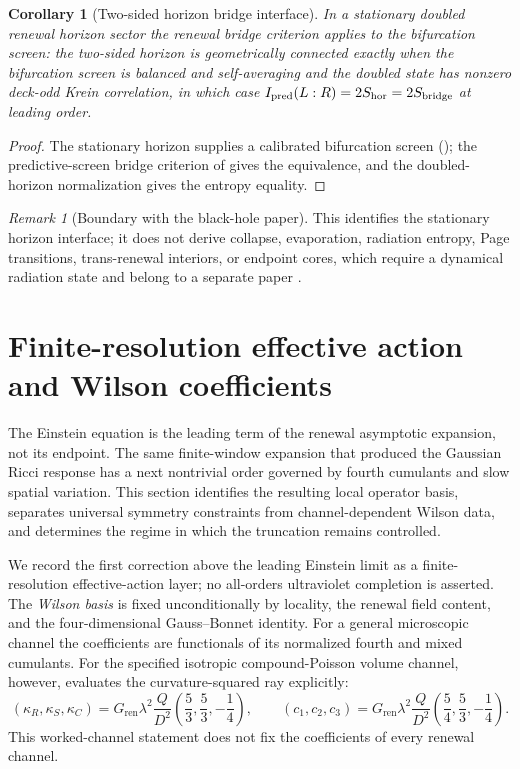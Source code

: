 \documentclass[11pt]{article}
\newtheorem{corollary}[theorem]{Corollary}
\theoremstyle{definition}
\theoremstyle{remark}
\newtheorem{remark}[theorem]{Remark}
\newcommand{\bridge}{\mathrm{bridge}}
\newcommand{\hor}{\mathrm{hor}}
\newcommand{\Gren}{G_{\mathrm{ren}}}
\newcommand{\kR}{\kappa_R}
\newcommand{\kS}{\kappa_S}
\newcommand{\kC}{\kappa_C}
\begin{document}
\begin{corollary}[Two-sided horizon bridge interface]
\label{cor:two-sided}
In a stationary doubled renewal horizon sector the renewal bridge criterion applies
to the bifurcation screen: the two-sided horizon is geometrically connected exactly
when the bifurcation screen is balanced and self-averaging and the doubled state has
nonzero deck-odd Krein correlation, in which case
$I_{\rm pred}(L:R)=2S_{\hor}=2S_{\bridge}$ at leading order.
\end{corollary}

\begin{proof}
The stationary horizon supplies a calibrated bifurcation screen ();
the predictive-screen bridge criterion of \cite{PelissierBridge} gives the
equivalence, and the doubled-horizon normalization gives the entropy equality.
\end{proof}

\begin{remark}[Boundary with the black-hole paper]
This identifies the stationary horizon interface; it does not derive collapse,
evaporation, radiation entropy, Page transitions, trans-renewal interiors, or
endpoint cores, which require a dynamical radiation state and belong to a separate
paper \cite{PelissierBlackHoles}.
\end{remark}

\section{Finite-resolution effective action and Wilson coefficients}
\label{sec:qg}

The Einstein equation is the leading term of the renewal asymptotic expansion,
not its endpoint.  The same finite-window expansion that produced the Gaussian
Ricci response has a next nontrivial order governed by fourth cumulants and
slow spatial variation.  This section identifies the resulting local operator
basis, separates universal symmetry constraints from channel-dependent Wilson
data, and determines the regime in which the truncation remains controlled.

We record the first correction above the leading Einstein limit as a
finite-resolution effective-action layer; no all-orders ultraviolet completion
is asserted.  The \emph{Wilson basis} is
fixed unconditionally by locality, the renewal field content, and the
four-dimensional Gauss--Bonnet identity.  For a general microscopic channel
the coefficients are functionals of its normalized fourth and mixed cumulants.
For the specified isotropic compound-Poisson volume channel, however,
 evaluates the curvature-squared ray explicitly:
\[
 (\kR,\kS,\kC)
 =\Gren\lambda^2\frac{Q}{D^2}
   \left(\frac53,\frac53,-\frac14\right),
 \qquad
 (c_1,c_2,c_3)
 =\Gren\lambda^2\frac{Q}{D^2}
   \left(\frac54,\frac53,-\frac14\right).
\]
This worked-channel statement does not fix the coefficients of every renewal
channel.
\end{document}
